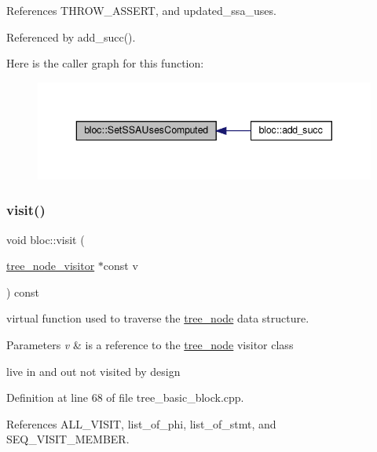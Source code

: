 References T\+H\+R\+O\+W\+\_\+\+A\+S\+S\+E\+RT, and updated\+\_\+ssa\+\_\+uses.



Referenced by add\+\_\+succ().

Here is the caller graph for this function\+:
\nopagebreak
\begin{figure}[H]
\begin{center}
\leavevmode
\includegraphics[width=343pt]{d6/df6/structbloc_ad0095b4227078a8b5709cb80a1f2d2db_icgraph}
\end{center}
\end{figure}
\mbox{\label{structbloc_a59781838b81594687d263f79899f54bc}} 
\subsubsection{\texorpdfstring{visit()}{visit()}}
{\footnotesize\ttfamily void bloc\+::visit (\begin{DoxyParamCaption}\item[{\hyperlink{classtree__node__visitor}{tree\+\_\+node\+\_\+visitor} $\ast$const}]{v }\end{DoxyParamCaption}) const\hspace{0.3cm}{\ttfamily [virtual]}}



virtual function used to traverse the \hyperlink{classtree__node}{tree\+\_\+node} data structure. 


\begin{DoxyParams}{Parameters}
{\em v} & is a reference to the \hyperlink{classtree__node}{tree\+\_\+node} visitor class \\
\hline
\end{DoxyParams}
live in and out not visited by design 

Definition at line 68 of file tree\+\_\+basic\+\_\+block.\+cpp.



References A\+L\+L\+\_\+\+V\+I\+S\+IT, list\+\_\+of\+\_\+phi, list\+\_\+of\+\_\+stmt, and S\+E\+Q\+\_\+\+V\+I\+S\+I\+T\+\_\+\+M\+E\+M\+B\+ER.




